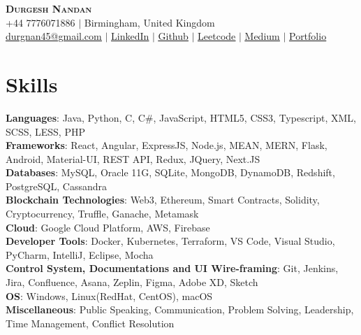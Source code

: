 \documentclass[letterpaper,11pt]{article}
\begin{document}

\begin{center}
    \textbf{\Huge \scshape Durgesh Nandan} \\ \vspace{1pt}
    \small +44 7776071886 $|$ Birmingham, United Kingdom \\ \href{mailto:durgnan45@gmail.com}{\underline{durgnan45@gmail.com}} $|$ 
    \href{https://www.linkedin.com/in/durgesh-nandan-75a80b140}{\underline{LinkedIn}} $|$
    \href{https://github.com/durgnan}{\underline{Github}} $|$
    \href{https://leetcode.com/durgnan/}{\underline{Leetcode}} $|$
    \href{https://medium.com/@durgnan45}{\underline{Medium}} $|$ 
    \href{https://durgnan.github.io}{\underline{Portfolio}}
\end{center}

\section{Skills}
 \begin{itemize}[leftmargin=0.15in, label={}]
    \small{\item{
     \textbf{Languages}{: Java, Python, C, C\#, JavaScript, HTML5, CSS3, Typescript, XML, SCSS, LESS, PHP} \\
     \textbf{Frameworks}{: React, Angular, ExpressJS, Node.js, MEAN, MERN, Flask, Android, Material-UI, REST API, Redux, JQuery, Next.JS} \\
     \textbf{Databases}{: MySQL, Oracle 11G, SQLite, MongoDB, DynamoDB, Redshift, PostgreSQL, Cassandra} \\
     \textbf{Blockchain Technologies}{: Web3, Ethereum, Smart Contracts, Solidity, Cryptocurrency, Truffle, Ganache, Metamask} \\
     \textbf{Cloud}{: Google Cloud Platform, AWS, Firebase} \\
     \textbf{Developer Tools}{: Docker, Kubernetes, Terraform, VS Code, Visual Studio, PyCharm, IntelliJ, Eclipse, Mocha} \\
     \textbf{Control System, Documentations and UI Wire-framing}{: Git, Jenkins, Jira, Confluence, Asana, Zeplin, Figma, Adobe XD, Sketch} \\
     \textbf{OS}{: Windows, Linux(RedHat, CentOS), macOS} \\
     \textbf{Miscellaneous}{: Public Speaking, Communication, Problem Solving, Leadership, Time Management, Conflict Resolution }
    }}
 \end{itemize}
\end{document}

